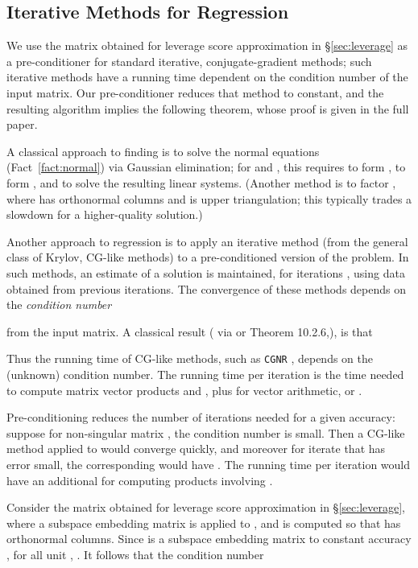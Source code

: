 \documentclass{sig-alternate}
\begin{document}
\subsection{Iterative Methods for Regression}\label{subsec:iterative}

\ifSTOC
We use the matrix  obtained for leverage score approximation
in \S\ref{sec:leverage} as a pre-conditioner for standard
iterative, conjugate-gradient methods; such iterative methods
have a running time dependent on the condition number
of the input matrix. Our pre-conditioner reduces that method to 
constant, and the resulting algorithm implies the following
theorem, whose proof is given in the full paper.
\else

A classical approach to finding 
is to solve the normal equations (Fact~\ref{fact:normal})
 via Gaussian elimination;
for  and ,
this requires  to
form ,  to form ,
and  to solve the resulting linear systems.
(Another method is to factor ,
where  has orthonormal columns and  is
upper triangulation; this typically trades a slowdown for a higher-quality solution.)

Another approach to regression is to apply an iterative method
(from the general class of Krylov, CG-like methods) to a 
pre-conditioned version of the problem.  In such methods,
an estimate  of a solution is maintained,
for iterations ,
using data obtained from previous iterations.
The convergence of these methods depends
on the \emph{condition number}

from the input matrix.
A classical result (\cite{Luen} via \cite{MSM} or Theorem 10.2.6,\cite{GvL}),
is that

Thus the running time of CG-like methods, such as {\tt CGNR} \cite{GvL},
depends on the (unknown)
condition number. The running time per iteration is the time needed
to compute matrix vector products  and ,
plus  for vector arithmetic, or .

Pre-conditioning reduces the number of iterations needed for a given accuracy:
suppose
for non-singular matrix , the condition number 
is small. Then a CG-like method applied to  would converge quickly,
and moreover for iterate  that has error 
small, the corresponding  would have .
The running time per iteration would have an
additional  for computing products involving .

Consider the matrix  obtained for leverage score approximation
in \S\ref{sec:leverage}, where a subspace embedding matrix 
is applied to , and  is computed so that   has
orthonormal columns. Since  is a subspace
embedding matrix to constant accuracy ,
for all unit ,
.
It follows that the condition number
\end{document}
